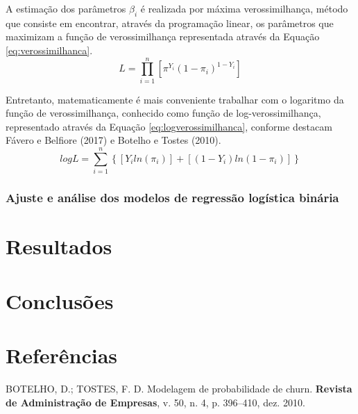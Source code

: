 \documentclass[twocolumn]{rbef}
\newcommand{\1}{\mathbbm{1}}
\begin{document}
A estimação dos parâmetros \(\beta_i\) é realizada por máxima verossimilhança, método que consiste em encontrar, através da programação linear, os parâmetros que maximizam a função de verossimilhança representada através da Equação \eqref{eq:verossimilhanca}.
\begin{equation}
L =  \prod_{i=1}^{n} \left[ \pi^{Y_i} (1-\pi_i)^{1-Y_i} \right]\label{eq:verossimilhanca}
\end{equation}

Entretanto, matematicamente é mais conveniente trabalhar com o logaritmo da função de verossimilhança, conhecido como função de log-verossimilhança, representado através da Equação \eqref{eq:logverossimilhanca}, conforme destacam Fávero e Belfiore (2017) e Botelho e Tostes (2010).
\begin{equation}
logL = \sum_{i=1}^{n} \left\{ \left[Y_iln(\pi_i)\right] + \left[(1-Y_i)ln(1-\pi_i)\right] \right\}\label{eq:logverossimilhanca}
\end{equation}

\hypertarget{ajuste-e-anuxe1lise-dos-modelos-de-regressuxe3o-loguxedstica-binuxe1ria}{%
\subsubsection{Ajuste e análise dos modelos de regressão logística binária}\label{ajuste-e-anuxe1lise-dos-modelos-de-regressuxe3o-loguxedstica-binuxe1ria}}

\hypertarget{resultados}{%
\section{Resultados}\label{resultados}}

\hypertarget{conclusuxf5es}{%
\section{Conclusões}\label{conclusuxf5es}}

\hypertarget{referuxeancias}{%
\section*{Referências}\label{referuxeancias}}

\hypertarget{refs}{}
\leavevmode\hypertarget{ref-Botelho2010}{}%
BOTELHO, D.; TOSTES, F. D. Modelagem de probabilidade de churn. \textbf{Revista de Administração de Empresas}, v. 50, n. 4, p. 396--410, dez. 2010.
\end{document}
